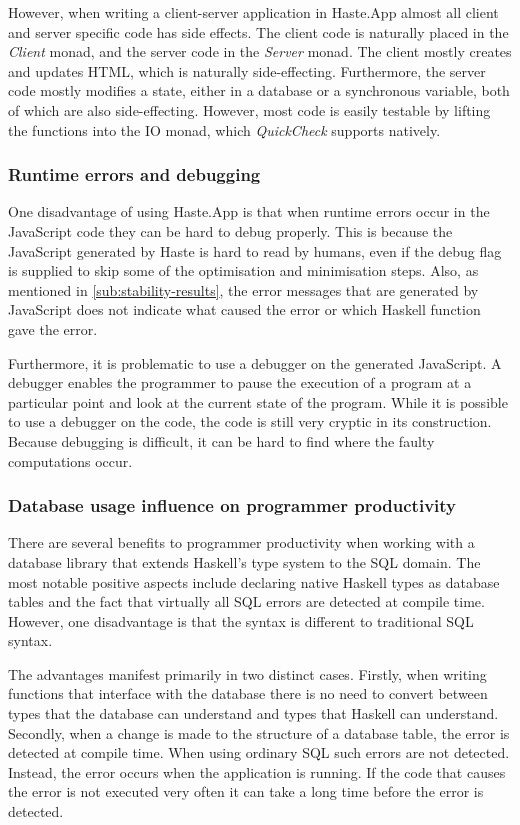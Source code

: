 \documentclass[a4paper]{article}
\begin{document}
However, when writing a client-server application in Haste.App almost all client and server specific code has side effects. The client code is naturally placed in the \textit{Client} monad, and the server code in the \textit{Server} monad. The client mostly creates and updates HTML, which is naturally side-effecting. Furthermore, the server code mostly modifies a state, either in a database or a synchronous variable, both of which are also side-effecting. However, most code is easily testable by lifting the functions into the IO monad, which \textit{QuickCheck} supports natively.


\subsubsection{Runtime errors and debugging}
\label{subsub:runtime-errors-debugging}
One disadvantage of using Haste.App is that when runtime errors occur in the JavaScript code they can be hard to debug properly. This is because the JavaScript generated by Haste is hard to read by humans, even if the debug flag is supplied to skip some of the optimisation and minimisation steps. Also, as mentioned in \cref{sub:stability-results}, the error messages that are generated by JavaScript does not indicate what caused the error or which Haskell function gave the error. 

Furthermore, it is problematic to use a debugger on the generated JavaScript. A debugger enables the programmer to pause the execution of a program at a particular point and look at the current state of the program. While it is possible to use a debugger on the code, the code is still very cryptic in its construction. Because debugging is difficult, it can be hard to find where the faulty computations occur.


\subsubsection{Database usage influence on programmer productivity}
\label{subsub:database-results}
There are several benefits to programmer productivity when working with a database library that extends Haskell's type system to the SQL domain. The most notable positive aspects include declaring native Haskell types as database tables and the fact that virtually all SQL errors are detected at compile time. However, one disadvantage is that the syntax is different to traditional SQL syntax.

The advantages manifest primarily in two distinct cases. Firstly, when writing functions that interface with the database there is no need to convert between types that the database can understand and types that Haskell can understand. Secondly, when a change is made to the structure of a database table, the error is detected at compile time. When using ordinary SQL such errors are not detected. Instead, the error occurs when the application is running. If the code that causes the error is not executed very often it can take a long time before the error is detected. 
\end{document}

